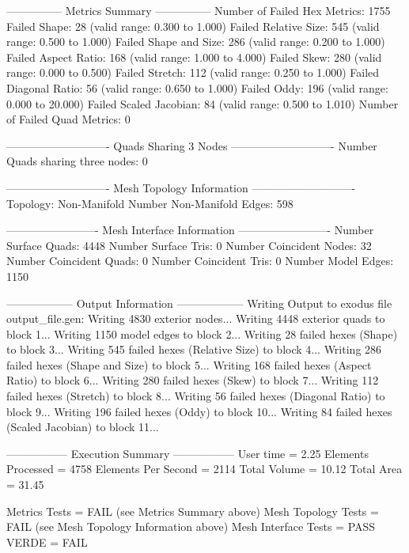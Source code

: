 \documentclass[10pt]{report}
\begin{document}
\begin{example}
{---------------
Metrics Summary
---------------
   Number of Failed Hex Metrics: 1755
      Failed Shape: 28  	(valid range:      0.300 to      1.000)
      Failed Relative Size: 545  	(valid range:      0.500 to      1.000)
      Failed Shape and Size: 286  	(valid range:      0.200 to      1.000)
      Failed Aspect Ratio: 168  	(valid range:      1.000 to      4.000)
      Failed Skew: 280  	(valid range:      0.000 to      0.500)
      Failed Stretch: 112  	(valid range:      0.250 to      1.000)
      Failed Diagonal Ratio: 56  	(valid range:      0.650 to      1.000)
      Failed Oddy: 196  	(valid range:      0.000 to     20.000)
      Failed Scaled Jacobian: 84  	(valid range:      0.500 to      1.010)
   Number of Failed Quad Metrics: 0

----------------------------
Quads Sharing 3 Nodes
----------------------------
   Number Quads sharing three nodes:  0

----------------------------
Mesh Topology Information
----------------------------
   Topology: Non-Manifold
   Number Non-Manifold Edges:  598

-------------------------
Mesh Interface Information
-------------------------
   Number Surface Quads:     4448
   Number Surface Tris:      0
   Number Coincident Nodes:  32
   Number Coincident Quads:   0
   Number Coincident Tris:   0
   Number Model Edges:       1150



------------------
Output Information
------------------
   Writing Output to exodus file output_file.gen:
   Writing 4830 exterior nodes...
   Writing 4448 exterior quads to block 1...
   Writing 1150 model edges to block 2...
   Writing 28 failed hexes (Shape) to block 3...
   Writing 545 failed hexes (Relative Size) to block 4...
   Writing 286 failed hexes (Shape and Size) to block 5...
   Writing 168 failed hexes (Aspect Ratio) to block 6...
   Writing 280 failed hexes (Skew) to block 7...
   Writing 112 failed hexes (Stretch) to block 8...
   Writing 56 failed hexes (Diagonal Ratio) to block 9...
   Writing 196 failed hexes (Oddy) to block 10...
   Writing 84 failed hexes (Scaled Jacobian) to block 11...

-----------------
Execution Summary
-----------------
   User time             = 2.25
   Elements Processed    = 4758
   Elements Per Second   = 2114
   Total Volume          = 10.12
   Total Area            = 31.45

   Metrics Tests         = FAIL  (see Metrics Summary above)
   Mesh Topology Tests   = FAIL (see Mesh Topology Information above)
   Mesh Interface Tests  = PASS
   VERDE                 = FAIL

}
\end{example}
\end{document}
